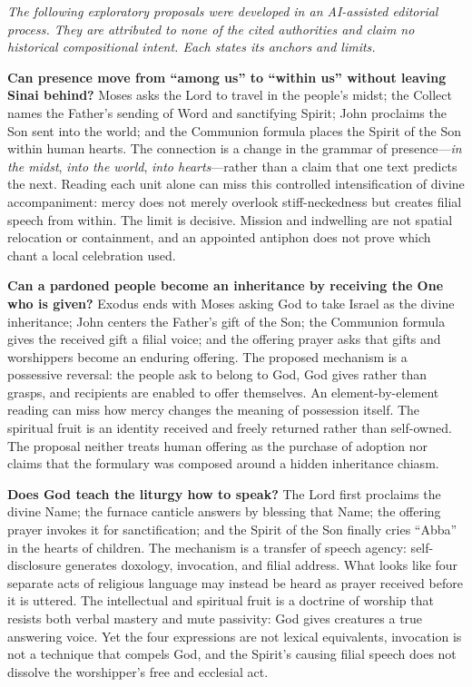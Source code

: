 \begin{deepstudy}
\noindent\emph{The following exploratory proposals were developed in an AI-assisted editorial process. They are attributed to none of the cited authorities and claim no historical compositional intent. Each states its anchors and limits.}

\noindent\textbf{Can presence move from “among us” to “within us” without leaving Sinai behind?\enspace{}}
Moses asks the Lord to travel in the people's midst; the Collect names the Father's sending of Word and sanctifying Spirit; John proclaims the Son sent into the world; and the Communion formula places the Spirit of the Son within human hearts. The connection is a change in the grammar of presence---\emph{in the midst}, \emph{into the world}, \emph{into hearts}---rather than a claim that one text predicts the next. Reading each unit alone can miss this controlled intensification of divine accompaniment: mercy does not merely overlook stiff-neckedness but creates filial speech from within. The limit is decisive. Mission and indwelling are not spatial relocation or containment, and an appointed antiphon does not prove which chant a local celebration used.

\noindent\textbf{Can a pardoned people become an inheritance by receiving the One who is given?\enspace{}}
Exodus ends with Moses asking God to take Israel as the divine inheritance; John centers the Father's gift of the Son; the Communion formula gives the received gift a filial voice; and the offering prayer asks that gifts and worshippers become an enduring offering. The proposed mechanism is a possessive reversal: the people ask to belong to God, God gives rather than grasps, and recipients are enabled to offer themselves. An element-by-element reading can miss how mercy changes the meaning of possession itself. The spiritual fruit is an identity received and freely returned rather than self-owned. The proposal neither treats human offering as the purchase of adoption nor claims that the formulary was composed around a hidden inheritance chiasm.

\noindent\textbf{Does God teach the liturgy how to speak?\enspace{}}
The Lord first proclaims the divine Name; the furnace canticle answers by blessing that Name; the offering prayer invokes it for sanctification; and the Spirit of the Son finally cries “Abba” in the hearts of children. The mechanism is a transfer of speech agency: self-disclosure generates doxology, invocation, and filial address. What looks like four separate acts of religious language may instead be heard as prayer received before it is uttered. The intellectual and spiritual fruit is a doctrine of worship that resists both verbal mastery and mute passivity: God gives creatures a true answering voice. Yet the four expressions are not lexical equivalents, invocation is not a technique that compels God, and the Spirit's causing filial speech does not dissolve the worshipper's free and ecclesial act.


\end{deepstudy}
